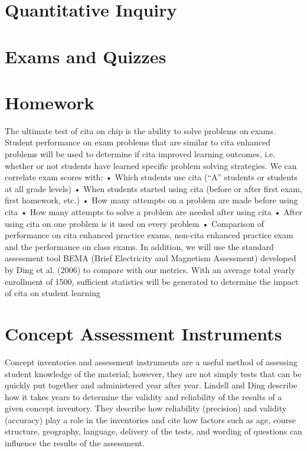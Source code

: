 \section{Quantitative Inquiry}

\section{Exams and Quizzes}



\section{Homework}

The ultimate test of \gls{cita} on \gls{chip} is the ability to solve problems on exams. Student
performance on exam problems that are similar to \gls{cita} enhanced problems will be used to
determine if \gls{cita} improved learning outcomes, i.e. whether or not students have learned
specific problem solving strategies. We can correlate exam scores with:
• Which students use \gls{cita} (“A” students or students at all grade levels)
• When students started using \gls{cita} (before or after first exam, first homework, etc.)
• How many attempts on a problem are made before using \gls{cita}
• How many attempts to solve a problem are needed after using \gls{cita}
• After using \gls{cita} on one problem is it used on every problem
• Comparison of performance on \gls{cita} enhanced practice exams, non-\gls{cita} enhanced
practice exam and the performance on class exams.
In addition, we will use the standard assessment tool BEMA (Brief Electricity and Magnetism
Assessment) developed by Ding et al. (2006) to compare with our metrics. With an average total
yearly enrollment of 1500, sufficient statistics will be generated to determine the impact of \gls{cita}
on student learning

\section{Concept Assessment Instruments}

Concept inventories and assessment instruments are a useful method of assessing student knowledge of the material; however, they are not simply tests that can be quickly put together and administered year after year. Lindell and Ding describe how it takes years to determine the validity and reliability of the results of a given concept inventory. They describe how reliability (precision) and validity (accuracy) play a role in the inventories and cite how factors such as age, course structure, geography, language, delivery of the tests, and wording of questions can influence the results of the assessment\cite{lindell2012}.

